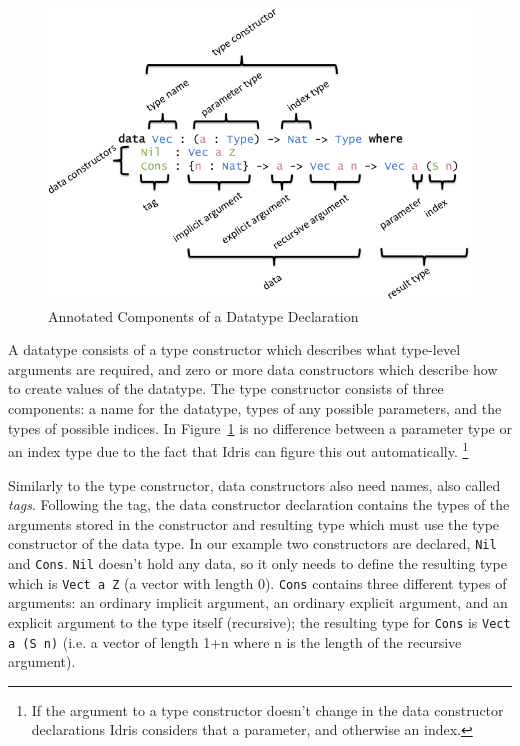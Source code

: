 \documentclass{ituthesis}
\begin{document}
\begin{figure}[ht]
\begin{center}
    \includegraphics[scale=0.5]{Figures/AnatomyOfADatatype.png}
\end{center}
\caption{Annotated Components of a Datatype Declaration}
\label{fig:anatomydatatype}
\end{figure}

A datatype consists of a type constructor which describes what type-level arguments are required, and zero or more data constructors which describe how to create values of the datatype.
The type constructor consists of three components: a name for the datatype, types of any possible parameters, and the types of possible indices. In Figure~\ref{fig:anatomydatatype} is no difference between a parameter type or an index type due to the fact that
Idris can figure this out automatically. \footnote{If the argument to a type constructor doesn't change in the data constructor declarations Idris considers that a parameter, and otherwise an index.}

Similarly to the type constructor, data constructors also need names, also called \textit{tags}.
Following the tag, the data constructor declaration contains the types of the arguments stored in the constructor and resulting type which must use the type constructor of the data type.
In our example two constructors are declared, \texttt{Nil} and \texttt{Cons}.
\texttt{Nil} doesn't hold any data, so it only needs to define the resulting type which is \texttt{Vect a Z} (a vector with length 0).
\texttt{Cons} contains three different types of arguments: an ordinary implicit argument, an ordinary explicit argument, and an explicit argument to the type itself (recursive); the resulting type for \texttt{Cons} is \texttt{Vect a (S n)} (i.e. a vector of length 1+n where n is the length of the recursive argument).
\end{document}
